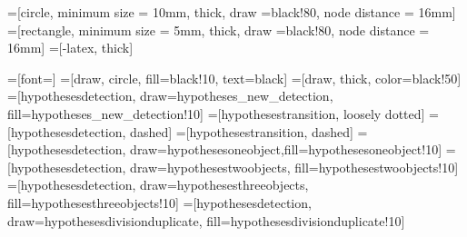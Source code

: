 \usepackage{tikz}
\usetikzlibrary{arrows}
\usetikzlibrary{snakes}
\usetikzlibrary{backgrounds}
\usetikzlibrary{patterns}
\usetikzlibrary{matrix}
\usetikzlibrary{shapes}
\usetikzlibrary{fit}
\usetikzlibrary{calc}
\usetikzlibrary{shadows}
\usetikzlibrary{plotmarks}
\usetikzlibrary{positioning}




=[circle, minimum size = 10mm, thick, draw =black!80, node distance = 16mm]
=[rectangle, minimum size = 5mm, thick, draw =black!80, node distance = 16mm]
=[-latex, thick]



=[font=\huge]
=[draw, circle, fill=black!10, text=black]
=[draw, thick, color=black!50]
=[hypothesesdetection, draw=hypotheses_new_detection, fill=hypotheses_new_detection!10]
=[hypothesestransition, loosely dotted]
=[hypothesesdetection, dashed]
=[hypothesestransition, dashed]
=[hypothesesdetection, draw=hypothesesoneobject,fill=hypothesesoneobject!10]
=[hypothesesdetection, draw=hypothesestwoobjects, fill=hypothesestwoobjects!10]
=[hypothesesdetection, draw=hypothesesthreeobjects, fill=hypothesesthreeobjects!10]
=[hypothesesdetection, draw=hypothesesdivisionduplicate,
fill=hypothesesdivisionduplicate!10]


